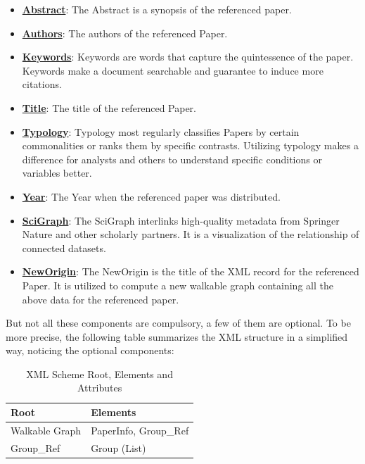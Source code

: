 \documentclass[12pt,a4paper,oneside,american,parskip=half]{article}
\begin{document}
\begin{justify}
\begin{normalsize}
\begin{itemize}
\item{\textbf{\underline{Abstract}}: The Abstract is a synopsis of the referenced paper.}
\item{\textbf{\underline{Authors}}: The authors of the referenced Paper.}
\item{\textbf{\underline{Keywords}}: Keywords are words that capture the quintessence of the paper. Keywords make a document searchable and guarantee to induce more citations.}
\item{\textbf{\underline{Title}}: The title of the referenced Paper.}
\item{\textbf{\underline{Typology}}: Typology most regularly classifies Papers by certain commonalities or ranks them by specific contrasts. Utilizing typology makes a difference for analysts and others to understand specific conditions or variables better.}
\item{\textbf{\underline{Year}}: The Year when the referenced paper was distributed.}
\item{\textbf{\underline{SciGraph}}: The SciGraph interlinks high-quality metadata from Springer Nature and other scholarly partners. It is a visualization of the relationship of connected datasets.}
\item{\textbf{\underline{NewOrigin}}: The NewOrigin is the title of the XML record for the referenced Paper. It is utilized to compute a new walkable graph containing all the above data for the referenced paper.}
\end{itemize}
But not all these components are compulsory, a few of them are optional. To be more precise, the following table summarizes the XML structure in a simplified way, noticing the optional components:
\clearpage
\begin{table}[h]
\centering
\caption{XML Scheme Root, Elements and Attributes}
\begin{adjustbox}{max width=\textwidth}
\begin{tabular}{|l|l|} 
\hline
\textcolor[rgb]{0.2,0.2,0.2}{\textbf{Root}}  & \textcolor[rgb]{0.2,0.2,0.2}{\textbf{Elements}}                                                                                                             \\ 
\hline
\textcolor[rgb]{0.2,0.2,0.2}{Walkable Graph} & \textcolor[rgb]{0.2,0.2,0.2}{PaperInfo, Group\_Ref}                                                                                                        \\ 
\hline
\textcolor[rgb]{0.2,0.2,0.2}{Group\_Ref}     & \textcolor[rgb]{0.2,0.2,0.2}{Group (List)}                                                                                                                  \\ 

\end{tabular}
\end{adjustbox}
\end{table}
\end{normalsize}
\end{justify}
\end{document}
